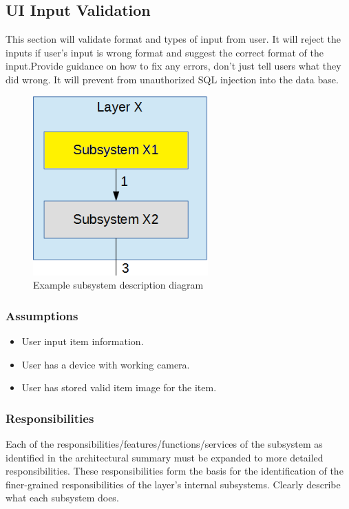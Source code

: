 \subsection{UI Input Validation}
This section will validate format and types of input from user. It will reject the inputs if user's input is wrong format and suggest the correct format of the input.Provide guidance on how to fix any errors, don't just tell users what they did wrong. It will prevent from unauthorized SQL injection into the data base.
\begin{figure}[h!]
	\centering
 	\includegraphics[width=0.60\textwidth]{images/subsystem}
 \caption{Example subsystem description diagram}
\end{figure}

\subsubsection{Assumptions}
\begin{itemize}
    \item User input item information.
    \item User has a device with working camera.
    \item User has stored valid item image for the item.
\end{itemize}

\subsubsection{Responsibilities}
Each of the responsibilities/features/functions/services of the subsystem as identified in the architectural summary must be expanded to more detailed responsibilities. These responsibilities form the basis for the identification of the finer-grained responsibilities of the layer's internal subsystems. Clearly describe what each subsystem does.

